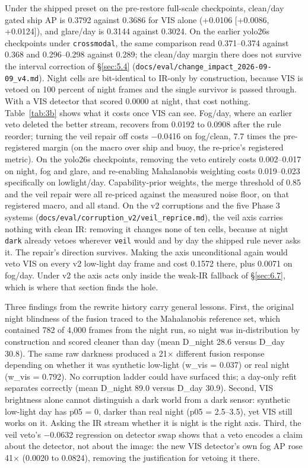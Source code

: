 \documentclass[10pt]{article}
\begin{document}
Under the shipped preset on the pre-restore full-scale checkpoints, clean/day gated ship AP is 0.3792 against 0.3686 for VIS alone (+0.0106 [+0.0086, +0.0124]), and glare/day is 0.3144 against 0.3024. On the earlier yolo26s checkpoints under \texttt{crossmodal}, the same comparison read 0.371--0.374 against 0.368 and 0.296--0.298 against 0.289; the clean/day margin there does not survive the interval correction of \S\ref{sec:5.4} (\texttt{docs/\allowbreak{}eval/\allowbreak{}change\_\allowbreak{}impact\_\allowbreak{}2026-09-09\_\allowbreak{}v4.md}). Night cells are bit-identical to IR-only by construction, because VIS is vetoed on 100 percent of night frames and the single survivor is passed through. With a VIS detector that scored 0.0000 at night, that cost nothing. Table~\ref{tab:3b} shows what it costs once VIS can see. Fog/day, where an earlier veto deleted the better stream, recovers from 0.0192 to 0.0908 after the rule reorder; turning the veil repair off costs $-$0.0416 on fog/clean, 7.7 times the pre-registered margin (on the macro over ship and buoy, the re-price's registered metric). On the yolo26s checkpoints, removing the veto entirely costs 0.002--0.017 on night, fog and glare, and re-enabling Mahalanobis weighting costs 0.019--0.023 specifically on lowlight/day. Capability-prior weights, the merge threshold of 0.85 and the veil repair were all re-priced against the measured noise floor, on that registered macro, and all stand. On the v2 corruptions and the five Phase 3 systems (\texttt{docs/\allowbreak{}eval/\allowbreak{}corruption\_\allowbreak{}v2/\allowbreak{}veil\_\allowbreak{}reprice.md}), the veil axis carries nothing with clean IR: removing it changes none of ten cells, because at night \texttt{dark} already vetoes wherever \texttt{veil} would and by day the shipped rule never asks it. The repair's direction survives. Making the axis unconditional again would veto VIS on every v2 low-light day frame and cost 0.1572 there, plus 0.0071 on fog/day. Under v2 the axis acts only inside the weak-IR fallback of \S\ref{sec:6.7}, which is where that section finds the hole.

Three findings from the rewrite history carry general lessons. First, the original night blindness of the fusion traced to the Mahalanobis reference set, which contained 782 of 4,000 frames from the night run, so night was in-distribution by construction and scored cleaner than day (mean D\_night 28.6 versus D\_day 30.8). The same raw darkness produced a 21$\times$ different fusion response depending on whether it was synthetic low-light (w\_vis = 0.037) or real night (w\_vis = 0.792). No corruption ladder could have surfaced this; a day-only refit separates correctly (mean D\_night 89.0 versus D\_day 30.9). Second, VIS brightness alone cannot distinguish a dark world from a dark sensor: synthetic low-light day has p05 = 0, darker than real night (p05 = 2.5--3.5), yet VIS still works on it. Asking the IR stream whether it is night is the right axis. Third, the veil veto's $-$0.0632 regression on detector swap shows that a veto encodes a claim about the detector, not about the image: the new VIS detector's own fog AP rose 41$\times$ (0.0020 to 0.0824), removing the justification for vetoing it there.
\end{document}
